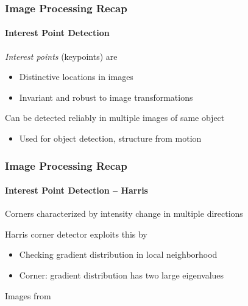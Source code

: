 \documentclass[xetex,professionalfont]{beamer}
\begin{document}

\begin{frame}
\frametitle{Image Processing Recap}
\framesubtitle{Interest Point Detection}

\emph{Interest points} (keypoints) are
\begin{itemize}
    \item Distinctive locations in images
    \item Invariant and robust to image transformations %
\end{itemize}

\bigskip
Can be detected reliably in multiple images of same object
\begin{itemize}
    \item Used for object detection, structure from motion
\end{itemize}

\end{frame}


\begin{frame}
\frametitle{Image Processing Recap}
\framesubtitle{Interest Point Detection -- Harris}

Corners characterized by intensity change in multiple directions

\bigskip
Harris corner detector exploits this by
\begin{itemize}
    \item Checking gradient distribution in local neighborhood
    \item Corner: gradient distribution has two large eigenvalues
\end{itemize}

\begin{center}
    {\centering Images from \cite{szeliski2010}}
\end{center}

\end{frame}

\end{document}
